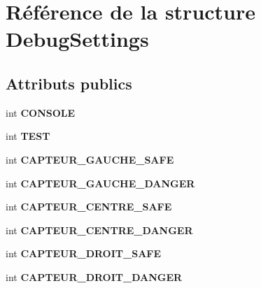 \hypertarget{struct_debug_settings}{\section{Référence de la structure Debug\-Settings}
\label{struct_debug_settings}
}
\subsection*{Attributs publics}
\begin{DoxyCompactItemize}
\item 
\hypertarget{struct_debug_settings_abd553e888464f3fd02ed933499516a1a}{int {\bfseries C\-O\-N\-S\-O\-L\-E}}\label{struct_debug_settings_abd553e888464f3fd02ed933499516a1a}

\item 
\hypertarget{struct_debug_settings_acf8aa9d1b832e4b2561ec3327af30638}{int {\bfseries T\-E\-S\-T}}\label{struct_debug_settings_acf8aa9d1b832e4b2561ec3327af30638}

\item 
\hypertarget{struct_debug_settings_acca84580e91ec56cfb2a38754c925102}{int {\bfseries C\-A\-P\-T\-E\-U\-R\-\_\-\-G\-A\-U\-C\-H\-E\-\_\-\-S\-A\-F\-E}}\label{struct_debug_settings_acca84580e91ec56cfb2a38754c925102}

\item 
\hypertarget{struct_debug_settings_ae72bb96e51715636053afe813e5f775f}{int {\bfseries C\-A\-P\-T\-E\-U\-R\-\_\-\-G\-A\-U\-C\-H\-E\-\_\-\-D\-A\-N\-G\-E\-R}}\label{struct_debug_settings_ae72bb96e51715636053afe813e5f775f}

\item 
\hypertarget{struct_debug_settings_ab09721cb0c21668eae5e54c5aa559ce4}{int {\bfseries C\-A\-P\-T\-E\-U\-R\-\_\-\-C\-E\-N\-T\-R\-E\-\_\-\-S\-A\-F\-E}}\label{struct_debug_settings_ab09721cb0c21668eae5e54c5aa559ce4}

\item 
\hypertarget{struct_debug_settings_ac9f0fcaa06d4bcc01c754431e073ce2b}{int {\bfseries C\-A\-P\-T\-E\-U\-R\-\_\-\-C\-E\-N\-T\-R\-E\-\_\-\-D\-A\-N\-G\-E\-R}}\label{struct_debug_settings_ac9f0fcaa06d4bcc01c754431e073ce2b}

\item 
\hypertarget{struct_debug_settings_a691e13b0b84d60b2d1f309f7c2ccf3b3}{int {\bfseries C\-A\-P\-T\-E\-U\-R\-\_\-\-D\-R\-O\-I\-T\-\_\-\-S\-A\-F\-E}}\label{struct_debug_settings_a691e13b0b84d60b2d1f309f7c2ccf3b3}

\item 
\hypertarget{struct_debug_settings_a50361b94f264c2c0bacba3a51bc78e02}{int {\bfseries C\-A\-P\-T\-E\-U\-R\-\_\-\-D\-R\-O\-I\-T\-\_\-\-D\-A\-N\-G\-E\-R}}\label{struct_debug_settings_a50361b94f264c2c0bacba3a51bc78e02}


\end{DoxyCompactItemize}
